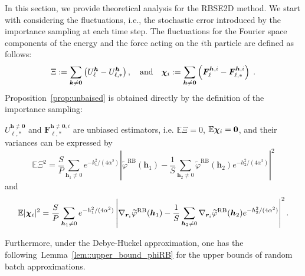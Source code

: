 In this section, we provide theoretical analysis for the RBSE2D method. We start with considering the fluctuations, i.e., the stochastic error introduced by the importance sampling at each time step.
The fluctuations for the Fourier space components of the energy and the force acting on the $i$th particle are defined as follows:
\begin{equation}\label{eq::xichi}
	\Xi := \sum_{\bm{k}\neq\bm{0}}\left( U_{\ell}^{\bm{h}}-U_{\ell,*}^{\bm{h}}\right),\quad\text{and}\quad\boldsymbol{\chi}_{i} :=\sum_{\bm{h}\neq\bm{0}}\left(\bm{F}_{\ell}^{\bm{h},i}-\bm{F}_{\ell,*}^{\bm{h},i}\right)\;.
\end{equation}
Proposition~\ref{prop:unbaised} is obtained directly by the definition of the importance sampling:
\begin{prop}\label{prop:unbaised}
	$U_{\ell,*}^{\bm{h}\neq\bm{0}}$ and $\bm{F}_{\ell,*}^{\bm{h}\neq\bm{0},i}$ are unbiased estimators, i.e. $\mathbb{E}\Xi= 0$, $\mathbb{E} \boldsymbol{\chi}_{i} = \bm 0$, and their variances can be expressed by
	\begin{equation}\label{eq::Exi}
		\mathbb{E}\Xi^2=\frac{S}{P}\sum_{\bm{h}_1\neq 0}e^{-k_1^2/(4\alpha^2)}\left|\widetilde{\varphi}^{\text{RB}}(\bm{h}_1)-\frac{1}{S} \sum_{\bm{h}_2\neq 0}\widetilde{\varphi}^{\text{RB}}(\bm{h}_2)e^{-h_2^2/(4\alpha^2)}\right|^2
	\end{equation}
	and
	\begin{equation}\label{eq::Echi}
		\mathbb{E}|\boldsymbol{\chi}_{i}|^2=\frac{S}{P}\sum_{\bm{h}_1\neq 0}e^{-h_1^2/(4\alpha^2)}\left|\nabla_{\bm{r}_i}\widetilde{\varphi}^{\text{RB}}(\bm{h}_1)-\frac{1}{S} \sum_{\bm{h}_2\neq 0}\nabla_{\bm{r}_i}\widetilde{\varphi}^{\text{RB}}(\bm{h}_2)e^{-h_2^2/(4\alpha^2)}\right|^2.
	\end{equation}
\end{prop}

Furthermore, under the Debye-H$\ddot{\text{u}}$ckel approximation, one has the following~Lemma~\ref{lem::upper_bound_phiRB} for the upper bounds of random batch approximations.

